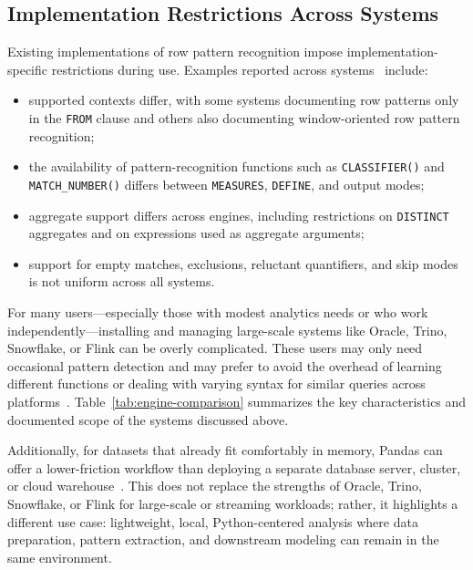 \subsection{Implementation Restrictions Across Systems}
\label{subsec:related-restrictions}

Existing implementations of row pattern recognition impose
implementation-specific restrictions during use.  Examples reported
across systems~\cite{oracle2022,oracle2021dwhsg,trino2022,flink,snowflake2025match_recognize,petkovic2022rpr}
include:

\begin{itemize}
  \item supported contexts differ, with some systems documenting
    row patterns only in the \texttt{FROM} clause and others also
    documenting window-oriented row pattern recognition;
  \item the availability of pattern-recognition functions such as
    \texttt{CLASSIFIER()} and \texttt{MATCH\_NUMBER()} differs
    between \texttt{MEASURES}, \texttt{DEFINE}, and output modes;
  \item aggregate support differs across engines, including
    restrictions on \texttt{DISTINCT} aggregates and on expressions
    used as aggregate arguments;
  \item support for empty matches, exclusions, reluctant
    quantifiers, and skip modes is not uniform across all systems.
\end{itemize}

For many users---especially those with modest analytics needs or who
work independently---installing and managing large-scale systems
like Oracle, Trino, Snowflake, or Flink can be overly complicated.
These users may only need occasional pattern detection and may prefer
to avoid the overhead of learning different functions or dealing
with varying syntax for similar queries across
platforms~\cite{8509400}.  Table~\ref{tab:engine-comparison}
summarizes the key characteristics and documented scope of the
systems discussed above.

Additionally, for datasets that already fit comfortably in memory,
Pandas can offer a lower-friction workflow than deploying a separate
database server, cluster, or cloud warehouse~\cite{Evaluation,in-memory_processing}.
This does not replace the
strengths of Oracle, Trino, Snowflake, or Flink for large-scale or
streaming workloads; rather, it highlights a different use case:
lightweight, local, Python-centered analysis where data preparation,
pattern extraction, and downstream modeling can remain in the same
environment.

